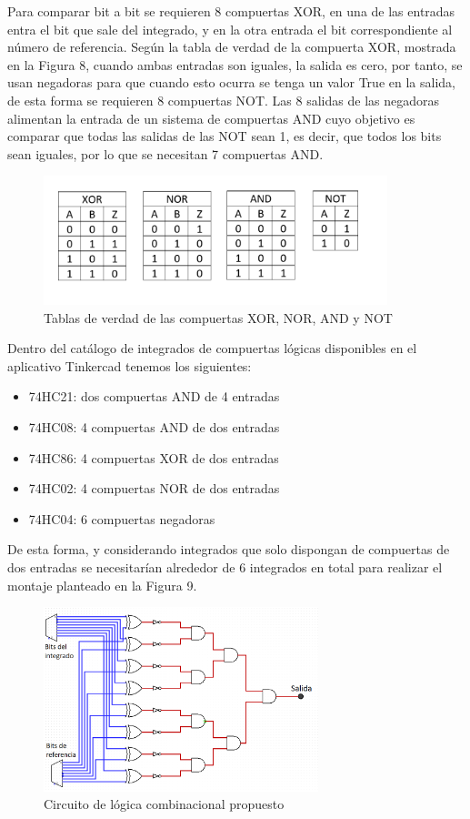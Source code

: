 \documentclass{article}
\begin{document}
Para comparar bit a bit se requieren 8 compuertas XOR, en una de las entradas entra el bit que sale del integrado, y en la otra entrada el bit correspondiente al número de referencia. Según la tabla de verdad de la compuerta XOR, mostrada en la Figura 8, cuando ambas entradas son iguales, la salida es cero, por tanto, se usan negadoras para que cuando esto ocurra se tenga un valor True en la salida, de esta forma se requieren 8 compuertas NOT. Las 8 salidas de las negadoras alimentan la entrada de un sistema de compuertas AND cuyo objetivo es comparar que todas las salidas de las NOT sean 1, es decir, que todos los bits sean iguales, por lo que se necesitan 7 compuertas AND.\\


\begin{figure}[!ht] 
\includegraphics[width=10cm]{compuertas.png}
\centering
\caption{Tablas de verdad de las compuertas XOR, NOR, AND y NOT}
\end{figure}

Dentro del catálogo de integrados de compuertas lógicas disponibles en el aplicativo Tinkercad tenemos los siguientes:
\begin{itemize}
    \item 74HC21: dos compuertas AND de 4 entradas
    \item 74HC08: 4 compuertas AND de dos entradas
    \item 74HC86: 4 compuertas XOR de dos entradas
    \item 74HC02: 4 compuertas NOR de dos entradas
    \item 74HC04: 6 compuertas negadoras\\
\end{itemize}

De esta forma, y considerando integrados que solo dispongan de compuertas de dos entradas se necesitarían alrededor de 6 integrados en total para realizar el montaje planteado en la Figura 9.

\begin{figure}[!h] 
\includegraphics[width=8cm]{logica1.png}
\centering
\caption{Circuito de lógica combinacional propuesto}
\end{figure}
\end{document}

